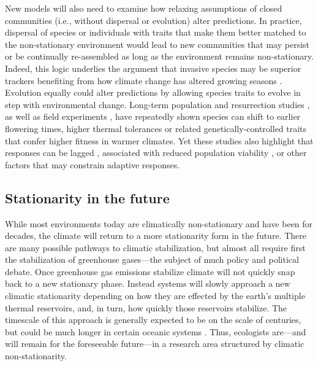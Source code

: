 \documentclass[11pt,letterpaper]{article}
\newcommand{\R}[1]{\label{#1}\linelabel{#1}}
\begin{document}
New models will also need to examine how relaxing assumptions of closed communities (i.e., without dispersal or evolution) alter predictions. In practice, dispersal of species or individuals with traits that make them better matched to the non-stationary environment would lead to new communities that may persist or be continually re-assembled as long as the environment remains non-stationary. Indeed, this logic underlies the argument that invasive species may be superior trackers benefiting from how climate change has altered growing seasons \citep{Willis:2010al,wolkovich:2010fee}. Evolution equally could alter predictions by allowing species traits to evolve in step with environmental change. Long-term population \citep[e.g.,][]{colautti2017} and resurrection studies \citep{wilczek2014,yousey2018}, as well as field experiments \citep{colautti2017,arab2019}, have repeatedly shown species can shift to earlier flowering times, higher thermal tolerances or related genetically-controlled traits that confer higher fitness in warmer climates. Yet these studies also highlight that responses can be lagged \citep[e.g.,][]{wilczek2014}, associated with reduced population viability \citep[e.g.,][]{colautti2017}, or other factors that may constrain adaptive responses. \R{constrain2}

\subsection{Stationarity in the future}

\R{nsfutstart} While most environments today are climatically non-stationary and have been for decades, the climate will return to a more stationarity form in the future. There are many possible pathways to climatic stabilization, but almost all require first the stabilization of greenhouse gases---the subject of much policy and political debate. Once greenhouse gas emissions stabilize climate will not quickly snap back to a new stationary phase. Instead systems will slowly approach a new climatic stationarity depending on how they are effected by the earth's multiple thermal reservoirs, and, in turn, how quickly those reservoirs stabilize. The timescale of this approach is generally expected to be on the scale of centuries, but could be much longer in certain oceanic systems \citep{ipcc2013ch12}. Thus, ecologists are---and will remain for the foreseeable future---in a research area structured by climatic non-stationarity. 
\end{document}
